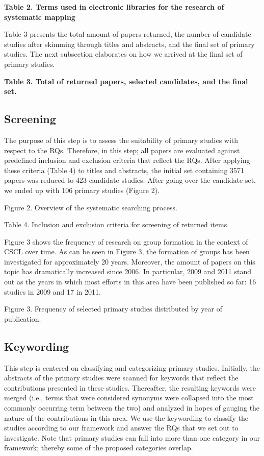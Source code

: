 \textbf{Table 2. Terms used in electronic libraries for the research of systematic mapping}

Table 3 presents the total amount of papers returned, the number of candidate studies after skimming through titles and abstracts, and the final set of primary studies. The next subsection elaborates on how we arrived at the final set of primary studies.

\textbf{Table 3. Total of returned papers, selected candidates, and the final set.}

\subsection{Screening}

The purpose of this step is to assess the suitability of primary studies with respect to the RQs. Therefore, in this step; all papers are evaluated against predefined inclusion and exclusion criteria that reflect the RQs. After applying these criteria (Table 4) to titles and abstracts, the initial set containing 3571 papers was reduced to 423 candidate studies. After going over the candidate set, we ended up with 106 primary studies (Figure 2).

Figure 2. Overview of the systematic searching process.

Table 4. Inclusion and exclusion criteria for screening of returned items.

Figure 3 shows the frequency of research on group formation in the context of CSCL over time. As can be seen in Figure 3, the formation of groups has been investigated for approximately 20 years. Moreover, the amount of papers on this topic has dramatically increased since 2006. In particular, 2009 and 2011 stand out as the years in which most efforts in this area have been published so far: 16 studies in 2009 and 17 in 2011. 

Figure 3. Frequency of selected primary studies distributed by year of publication.

\subsection{Keywording}

This step is centered on classifying and categorizing primary studies. Initially, the abstracts of the primary studies were scanned for keywords that reflect the contributions presented in these studies. Thereafter, the resulting keywords were merged (i.e., terms that were considered synonyms were collapsed into the most commonly occurring term between the two) and analyzed in hopes of gauging the nature of the contributions in this area. 
We use the keywording to classify the studies according to our framework and answer the RQs that we set out to investigate. Note that primary studies can fall into more than one category in our framework; thereby some of the proposed categories overlap.

